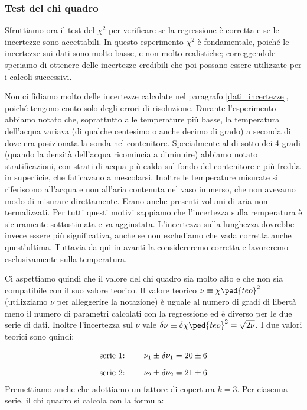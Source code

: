 \subsubsection{Test del chi quadro}

Sfruttiamo ora il test del $\chi^2$ per verificare se la regressione è corretta e se le incertezze sono accettabili.
In questo esperimento $\chi^2$ è fondamentale, poiché le incertezze sui dati sono molto basse, e non molto realistiche;
correggendole speriamo di ottenere delle incertezze credibili che poi possano essere utilizzate per i calcoli successivi.

Non ci fidiamo molto delle incertezze calcolate nel paragrafo \ref{dati_incertezze}, poiché tengono conto solo degli errori
di risoluzione. Durante l'esperimento abbiamo notato che, soprattutto alle temperature più basse, la temperatura dell'acqua
variava (di qualche centesimo o anche decimo di grado) a seconda di dove era posizionata la sonda nel contenitore. Specialmente
al di sotto dei 4 gradi (quando la densità dell'acqua ricomincia a diminuire) abbiamo notato stratificazioni, con strati di acqua
più calda sul fondo del contenitore e più fredda in superficie, che faticavano a mescolarsi. Inoltre le temperature misurate
si riferiscono all'acqua e non all'aria contenuta nel vaso immerso, che non avevamo modo di misurare direttamente. Erano anche
presenti volumi di aria non termalizzati. Per tutti questi motivi sappiamo che l'incertezza sulla remperatura è sicuramente
sottostimata e va aggiustata. L'incertezza sulla lunghezza dovrebbe invece essere più significativa, anche se non escludiamo
che vada corretta anche quest'ultima. Tuttavia da qui in avanti la considereremo corretta e lavoreremo esclusivamente sulla temperatura.

Ci aspettiamo quindi che il valore del chi quadro sia molto alto e che non sia compatibile con il suo valore teorico. Il valore teorico
$\nu \equiv \chi\ped{teo}^2$ (utilizziamo $\nu$ per alleggerire la notazione) è uguale al numero di gradi di libertà meno
il numero di parametri calcolati con la regressione ed è diverso per le due serie di dati. Inoltre l'incertezza sul
$\nu$ vale $\delta \nu \equiv \delta \chi\ped{teo}^2 = \sqrt{2\nu}$. I due valori teorici sono quindi:

\begin{equation}
    \begin{array}{l @{\hspace{0.8cm}} c}
        \text{serie 1:} & \nu_1 \pm \delta \nu_1 = 20 \pm 6 \\[3mm]
        \text{serie 2:} & \nu_2 \pm \delta \nu_2 = 21 \pm 6
    \end{array}
\end{equation}
%
Premettiamo anche che adottiamo un fattore di copertura $k = 3$.
Per ciascuna serie, il chi quadro si calcola con la formula:

